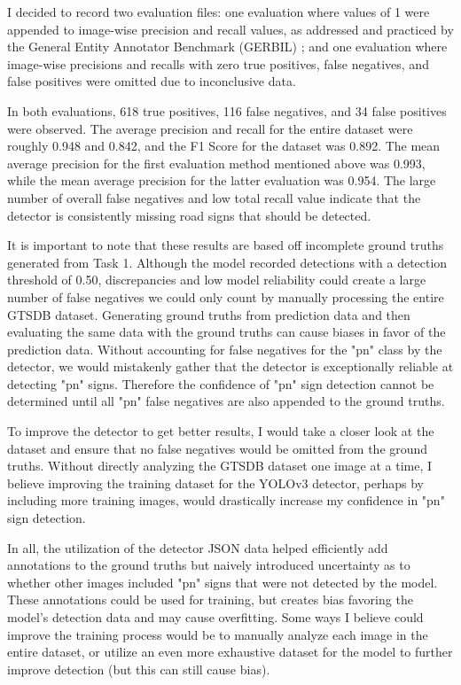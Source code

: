 \documentclass{article}
\begin{document}
                I decided to record two evaluation files: one evaluation where values of 1 were appended to image-wise precision and recall values, as addressed and practiced by the General Entity Annotator Benchmark (GERBIL) \cite{DBLP:journals/semweb/RoderUN18}; and one evaluation where image-wise precisions and recalls with zero true positives, false negatives, and false positives were omitted due to inconclusive data. 
                
                In both evaluations, 618 true positives, 116 false negatives, and 34 false positives were observed. The average precision and recall for the entire dataset were roughly 0.948 and 0.842, and the F1 Score for the dataset was 0.892. The mean average precision for the first evaluation method mentioned above was 0.993, while the mean average precision for the latter evaluation was 0.954. The large number of overall false negatives and low total recall value indicate that the detector is consistently missing road signs that should be detected. 
                
                It is important to note that these results are based off incomplete ground truths generated from Task 1. Although the model recorded detections with a detection threshold of 0.50, discrepancies and low model reliability could create a large number of false negatives we could only count by manually processing the entire GTSDB dataset. Generating ground truths from prediction data and then evaluating the same data with the ground truths can cause biases in favor of the prediction data. Without accounting for false negatives for the "pn" class by the detector, we would mistakenly gather that the detector is exceptionally reliable at detecting "pn" signs. Therefore the confidence of "pn" sign detection cannot be determined until all "pn" false negatives are also appended to the ground truths. 
                
                To improve the detector to get better results, I would take a closer look at the dataset and ensure that no false negatives would be omitted from the ground truths. Without directly analyzing the GTSDB dataset one image at a time, I believe improving the training dataset for the YOLOv3 detector, perhaps by including more training images, would drastically increase my confidence in "pn" sign detection. 
                
                In all, the utilization of the detector JSON data helped efficiently add annotations to the ground truths but naively introduced uncertainty as to whether other images included "pn" signs that were not detected by the model. These annotations could be used for training, but creates bias favoring the model's detection data and may cause overfitting. Some ways I believe could improve the training process would be to manually analyze each image in the entire dataset, or utilize an even more exhaustive dataset for the model to further improve detection (but this can still cause bias). 
                
        
    
    \pagebreak
    
    
    
    
    
\end{document}
